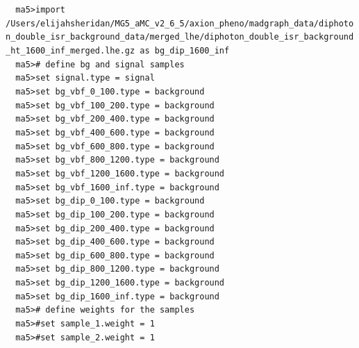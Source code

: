 \documentclass[a4paper, 10pt]{article}
\begin{document}
\texttt{ }\texttt{ }\texttt{ma5>import /\-Users/\-elijahsheridan/\-MG5\_aMC\_v2\_6\_5/\-axion\_pheno/\-madgraph\_data/\-diphoton\_double\_isr\_background\_data/\-merged\_lhe/\-diphoton\_double\_isr\_background\_ht\_1600\_inf\_merged.lhe.gz as bg\_dip\_1600\_inf\\
}
\texttt{ }\texttt{ }\texttt{ma5>\# define bg and signal samples\\
}
\texttt{ }\texttt{ }\texttt{ma5>set signal.type = signal\\
}
\texttt{ }\texttt{ }\texttt{ma5>set bg\_vbf\_0\_100.type = background\\
}
\texttt{ }\texttt{ }\texttt{ma5>set bg\_vbf\_100\_200.type = background\\
}
\texttt{ }\texttt{ }\texttt{ma5>set bg\_vbf\_200\_400.type  = background\\
}
\texttt{ }\texttt{ }\texttt{ma5>set bg\_vbf\_400\_600.type  = background\\
}
\texttt{ }\texttt{ }\texttt{ma5>set bg\_vbf\_600\_800.type  = background\\
}
\texttt{ }\texttt{ }\texttt{ma5>set bg\_vbf\_800\_1200.type  = background\\
}
\texttt{ }\texttt{ }\texttt{ma5>set bg\_vbf\_1200\_1600.type  = background\\
}
\texttt{ }\texttt{ }\texttt{ma5>set bg\_vbf\_1600\_inf.type = background\\
}
\texttt{ }\texttt{ }\texttt{ma5>set bg\_dip\_0\_100.type = background\\
}
\texttt{ }\texttt{ }\texttt{ma5>set bg\_dip\_100\_200.type = background\\
}
\texttt{ }\texttt{ }\texttt{ma5>set bg\_dip\_200\_400.type = background\\
}
\texttt{ }\texttt{ }\texttt{ma5>set bg\_dip\_400\_600.type = background\\
}
\texttt{ }\texttt{ }\texttt{ma5>set bg\_dip\_600\_800.type = background\\
}
\texttt{ }\texttt{ }\texttt{ma5>set bg\_dip\_800\_1200.type = background\\
}
\texttt{ }\texttt{ }\texttt{ma5>set bg\_dip\_1200\_1600.type = background\\
}
\texttt{ }\texttt{ }\texttt{ma5>set bg\_dip\_1600\_inf.type = background\\
}
\texttt{ }\texttt{ }\texttt{ma5>\# define weights for the samples\\
}
\texttt{ }\texttt{ }\texttt{ma5>\#set sample\_1.weight = 1\\
}
\texttt{ }\texttt{ }\texttt{ma5>\#set sample\_2.weight = 1\\
}
\end{document}
